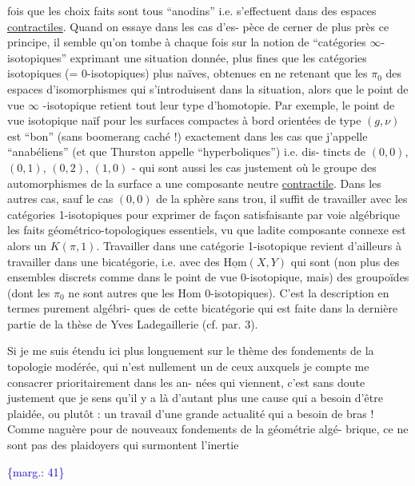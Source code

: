 \documentclass[11pt]{article}
\newcommand{\scanpage}[1]{\par\bigskip\noindent{\small\sffamily[scan #1]}\par}
\newcommand{\mspage}[1]{{\small\sffamily[p.\,#1]}}
\newcommand{\margin}[1]{\textcolor{blue}{\{\textsf{marg.:} #1\}}}
\newcommand{\uline}[1]{\underline{#1}}
\begin{document}
fois que les choix faits sont tous ``anodins'' i.e. s'effectuent
dans des espaces \uline{contractiles}. Quand on essaye dans les cas d'es-%
pèce de cerner de plus près ce principe, il semble qu'on tombe à
chaque fois sur la notion de ``catégories $\infty$- isotopiques'' exprimant
une situation donnée, plus fines que les catégories isotopiques
(= 0-isotopiques) plus naïves, obtenues en ne retenant que les $\pi_0$
des espaces d'isomorphismes qui s'introduisent dans la situation,
alors que le point de vue $\infty$ -isotopique retient tout leur type
d'homotopie. Par exemple, le point de vue isotopique naïf pour
les surfaces compactes à bord orientées de type $(g,\nu)$ est ``bon''
(sans boomerang caché !) exactement dans les cas que j'appelle
``anabéliens'' (et que Thurston appelle ``hyperboliques'') i.e. dis-%
tincts de $(0,0)$, $(0,1)$, $(0,2)$, $(1,0)$ - qui sont aussi les cas
justement où le groupe des automorphismes de la surface a une
composante neutre \uline{contractile}. Dans les autres cas, sauf le cas
$(0,0)$ de la sphère sans trou, il suffit de travailler avec les
catégories 1-isotopiques pour exprimer de façon satisfaisante par
voie algébrique les faits géométrico-topologiques essentiels, vu
que ladite composante connexe est alors un $K(\pi,1)$. Travailler
dans une catégorie 1-isotopique revient d'ailleurs à travailler
dans une bicatégorie, i.e. avec des $\underline{\mathrm{Hom}}(X,Y)$ qui sont (non plus
des ensembles discrets comme dans le point de vue 0-isotopique,
mais) des groupoïdes (dont les $\pi_0$ ne sont autres que les Hom
0-isotopiques). C'est la description en termes purement algébri-%
ques de cette bicatégorie qui est faite dans la dernière partie
de la thèse de Yves Ladegaillerie (cf. par. 3).

Si je me suis étendu ici plus longuement sur le thème
des fondements de la topologie modérée, qui n'est nullement un de
ceux auxquels je compte me consacrer prioritairement dans les an-%
nées qui viennent, c'est sans doute justement que je sens qu'il
y a là d'autant plus une cause qui a besoin d'être plaidée, ou
plutôt : un travail d'une grande actualité qui a besoin de bras !
Comme naguère pour de nouveaux fondements de la géométrie algé-%
brique, ce ne sont pas des plaidoyers qui surmontent l'inertie

\margin{41}

\clearpage
\scanpage{119/42}
\mspage{40}
\end{document}
